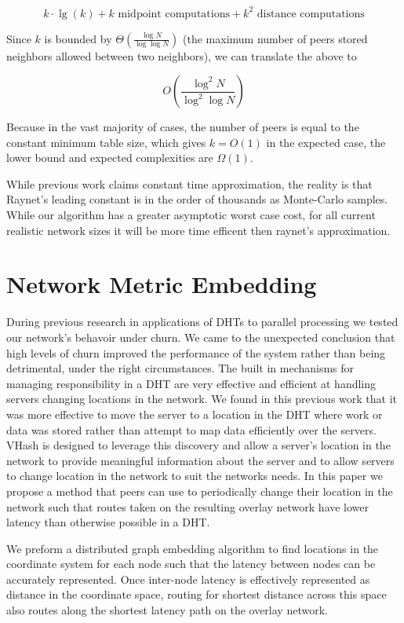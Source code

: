 \documentclass{IEEEtran}
\begin{document}
\[ k\cdot\lg(k) + k \text{ midpoint computations}  + k^{2} \text{ distance computations} \]


Since  $k$ is  bounded by $\Theta(\frac{\log N}{\log \log N} )$ \cite{bern1991expected} (the maximum number of peers stored neighbors allowed between two neighbors), we can translate the above to

\[O(\frac{\log^{2} N}{\log^{2} \log N} )\]

Because in the vast majority of cases, the number of peers is equal to the constant minimum table size, which gives $k=O(1)$ in the expected case, the lower bound and expected complexities  are $\Omega{}(1)$.

While previous work \cite{raynet} claims constant time approximation, the reality is that Raynet's leading constant is in the order of thousands as Monte-Carlo samples.  
While our algorithm has a greater asymptotic worst case cost, for all current realistic network sizes it will be more time efficent then raynet's approximation.



\section{Network Metric Embedding}
During previous research in applications of DHTs to parallel processing \cite{andrew-poster} we tested our network's behavoir under churn.
We came to the unexpected conclusion that high levels of churn  improved the performance of the system rather than being detrimental, under the right circumstances.
The built in mechanisms for managing responsibility in a DHT are very effective and efficient at handling servers changing locations in the network.
We found in this previous work that it was more effective to move the server to a location in the DHT where work or data was stored rather than attempt to map data efficiently over the servers.
VHash is designed to leverage this discovery and allow a server's location in the network to provide meaningful information about the server and to allow servers to change location in the network to suit the networks needs.
In this paper we propose a method that peers can use to periodically change their location in the network such that routes taken on the resulting overlay network have lower latency than otherwise possible in a DHT.

We preform a distributed graph embedding algorithm to find locations in the coordinate system for each node such that the latency between nodes can be accurately represented.
Once inter-node latency is effectively represented as distance in the coordinate space, routing for shortest distance across this space also routes along the shortest latency path on the overlay network.
\end{document}
